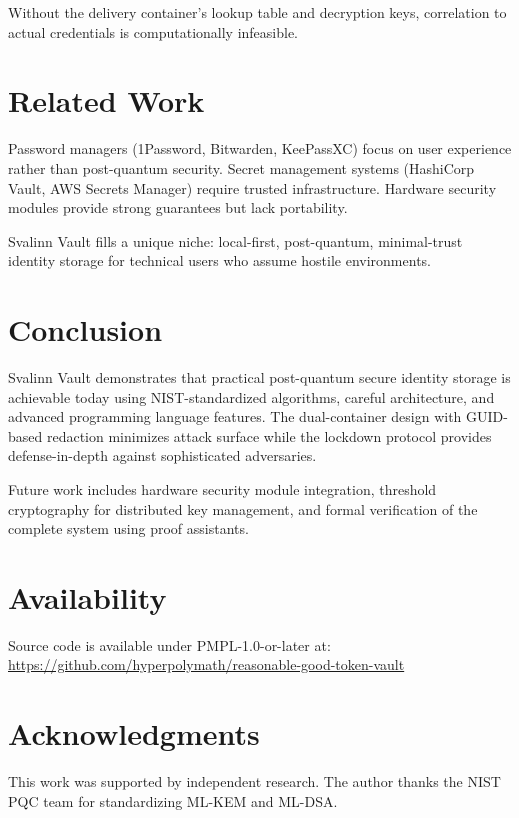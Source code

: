 \documentclass[11pt,a4paper]{article}
\begin{document}
Without the delivery container's lookup table and decryption keys, correlation to actual credentials is computationally infeasible.

\section{Related Work}

Password managers (1Password, Bitwarden, KeePassXC) focus on user experience rather than post-quantum security. Secret management systems (HashiCorp Vault, AWS Secrets Manager) require trusted infrastructure. Hardware security modules provide strong guarantees but lack portability.

Svalinn Vault fills a unique niche: local-first, post-quantum, minimal-trust identity storage for technical users who assume hostile environments.

\section{Conclusion}

Svalinn Vault demonstrates that practical post-quantum secure identity storage is achievable today using NIST-standardized algorithms, careful architecture, and advanced programming language features. The dual-container design with GUID-based redaction minimizes attack surface while the lockdown protocol provides defense-in-depth against sophisticated adversaries.

Future work includes hardware security module integration, threshold cryptography for distributed key management, and formal verification of the complete system using proof assistants.

\section*{Availability}

Source code is available under PMPL-1.0-or-later at:\\
\url{https://github.com/hyperpolymath/reasonable-good-token-vault}

\section*{Acknowledgments}

This work was supported by independent research. The author thanks the NIST PQC team for standardizing ML-KEM and ML-DSA.
\end{document}
